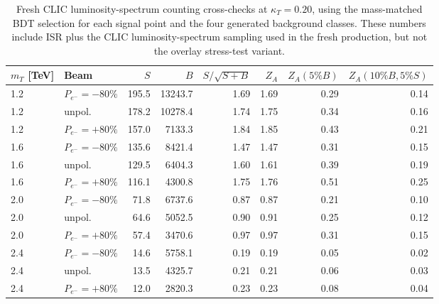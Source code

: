 \begin{table}[t]
\centering
\caption{Fresh CLIC luminosity-spectrum counting cross-checks at $\kappa_T=0.20$,
using the mass-matched BDT selection for each signal point and the four generated
background classes.  These numbers include ISR plus the CLIC luminosity-spectrum
sampling used in the fresh production, but not the overlay stress-test variant.}
\label{tab:fresh-clic-reach}
\small
\begin{tabular}{llrrrrrr}
\toprule
$m_T$ [TeV] & Beam & $S$ & $B$ & $S/\sqrt{S+B}$ & $Z_A$ & $Z_A(5\%B)$ & $Z_A(10\%B,5\%S)$ \\
\midrule
    1.2 & $P_{e^-}=-80\%$ & 195.5 & 13243.7 & 1.69 & 1.69 & 0.29 & 0.14 \\
    1.2 & unpol. & 178.2 & 10278.4 & 1.74 & 1.75 & 0.34 & 0.16 \\
    1.2 & $P_{e^-}=+80\%$ & 157.0 & 7133.3 & 1.84 & 1.85 & 0.43 & 0.21 \\
    1.6 & $P_{e^-}=-80\%$ & 135.6 & 8421.4 & 1.47 & 1.47 & 0.31 & 0.15 \\
    1.6 & unpol. & 129.5 & 6404.3 & 1.60 & 1.61 & 0.39 & 0.19 \\
    1.6 & $P_{e^-}=+80\%$ & 116.1 & 4300.8 & 1.75 & 1.76 & 0.51 & 0.25 \\
    2.0 & $P_{e^-}=-80\%$ & 71.8 & 6737.6 & 0.87 & 0.87 & 0.21 & 0.10 \\
    2.0 & unpol. & 64.6 & 5052.5 & 0.90 & 0.91 & 0.25 & 0.12 \\
    2.0 & $P_{e^-}=+80\%$ & 57.4 & 3470.6 & 0.97 & 0.97 & 0.31 & 0.15 \\
    2.4 & $P_{e^-}=-80\%$ & 14.6 & 5758.1 & 0.19 & 0.19 & 0.05 & 0.02 \\
    2.4 & unpol. & 13.5 & 4325.7 & 0.21 & 0.21 & 0.06 & 0.03 \\
    2.4 & $P_{e^-}=+80\%$ & 12.0 & 2820.3 & 0.23 & 0.23 & 0.08 & 0.04 \\
\bottomrule
\end{tabular}
\end{table}
